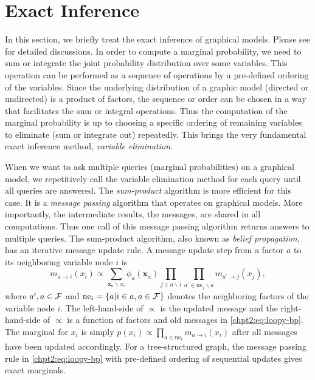 \section{Exact Inference}
\label{chpt2:sec:inference-mp}
In this section, we briefly treat the exact inference of graphical models. Please see \cite{Bishop:2006:PRM:1162264, koller2009pgm, yedida2005constucting, yedidia2003understanding} for detailed discussions. In order to compute a marginal probability, we need to sum or integrate the joint probability distribution over some variables. This operation can be performed as a sequence of operations by a pre-defined ordering of the variables. Since the underlying distribution of a graphic model (directed or undirected) is a product of factors, the sequence or order can be chosen in a way that facilitates the sum or integral operations. Thus the computation of the marginal probability is up to choosing a specific ordering of remaining variables to eliminate (sum or integrate out) repeatedly. This brings the very fundamental exact inference method, \textit{variable elimination}.

When we want to ask multiple queries (marginal probabilities) on a graphical model, we repetitively call the variable elimination method for each query until all queries are answered. The \textit{sum-product} algorithm is more efficient for this case. It is a \textit{message passing} algorithm that operates on graphical models. More importantly, the intermediate results, the messages, are shared in all computations. Thus one call of this message passing algorithm returns answers to multiple queries. The sum-product algorithm, also known as \textit{belief propagation}, has an iterative message update rule. A message update step from a factor $a$ to its neighboring variable node $i$ is 
\begin{equation}\label{chpt2:eq:loopy-bp}
  m_{a\rightarrow i}(x_i) \propto \sum_{\bm{x}_{a} \backslash x_i}
  \phi_{a}(\bm{x}_{a}) \prod_{j \in a \backslash i} \prod_{a^{\prime} \in \mathrm{ne}_j
    \backslash a} m_{a^{\prime}\rightarrow j}(x_j),
\end{equation}
where $a^\prime, a \in \mathcal{F}$ and $\mathrm{ne}_i = \left\{ a | i \in a, a \in \mathcal{F} \right\}$ denotes the neighboring factors of the variable node $i$. The left-hand-side of $\propto$ is the updated message and the right-hand-side of $\propto$ is a function of factors and old messages in \eqref{chpt2:eq:loopy-bp}. The marginal for $x_i$ is simply $p(x_i)\propto\prod_{a\in\mathrm{ne}_i}m_{a\rightarrow i}(x_i)$ after all messages have been updated accordingly. For a tree-structured graph, the message passing rule in \eqref{chpt2:eq:loopy-bp} with pre-defined ordering of sequential updates gives exact marginals.


